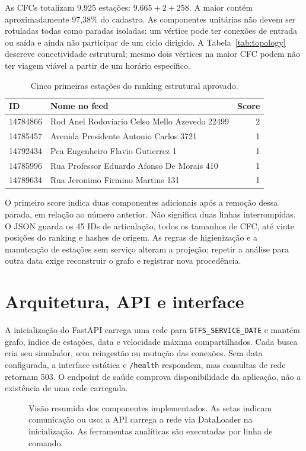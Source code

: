 \documentclass[12pt]{article}
\newcommand{\code}[1]{\texttt{#1}}
\begin{document}
As CFCs totalizam 9.925 estações: $9.665+2+258$. A maior contém aproximadamente 97,38\% do cadastro. As componentes unitárias não devem ser rotuladas todas como paradas isoladas: um vértice pode ter conexões de entrada ou saída e ainda não participar de um ciclo dirigido. A Tabela~\ref{tab:topology} descreve conectividade estrutural; mesmo dois vértices na maior CFC podem não ter viagem viável a partir de um horário específico.

\begin{table}[ht]
\centering
\caption{Cinco primeiras estações do ranking estrutural aprovado.}
\begin{tabularx}{\textwidth}{@{}lXr@{}}
\toprule ID & Nome no feed & Score \\
\midrule
14784866 & Rod Anel Rodoviario Celso Mello Azevedo 22499 & 2 \\
14785457 & Avenida Presidente Antonio Carlos 3721 & 1 \\
14792434 & Pca Engenheiro Flavio Gutierrez 1 & 1 \\
14785996 & Rua Professor Eduardo Afonso De Morais 410 & 1 \\
14789634 & Rua Jeronimo Firmino Martins 131 & 1 \\
\bottomrule
\end{tabularx}
\end{table}

O primeiro score indica duas componentes adicionais após a remoção dessa parada, em relação ao número anterior. Não significa duas linhas interrompidas. O JSON guarda os 45 IDs de articulação, todos os tamanhos de CFC, até vinte posições do ranking e hashes de origem. As regras de higienização e a manutenção de estações sem serviço alteram a projeção; repetir a análise para outra data exige reconstruir o grafo e registrar nova procedência.

\section{Arquitetura, API e interface}
A inicialização do FastAPI carrega uma rede para \code{GTFS\_SERVICE\_DATE} e mantém grafo, índice de estações, data e velocidade máxima compartilhados. Cada busca cria seu simulador, sem reingestão ou mutação das conexões. Sem data configurada, a interface estática e \code{/health} respondem, mas consultas de rede retornam 503. O endpoint de saúde comprova disponibilidade da aplicação, não a existência de uma rede carregada.

\begin{figure}[ht]
\centering

\caption{Visão resumida dos componentes implementados. As setas indicam comunicação ou uso; a API carrega a rede via DataLoader na inicialização. As ferramentas analíticas são executadas por linha de comando.}
\label{fig:components}
\end{figure}
\end{document}

